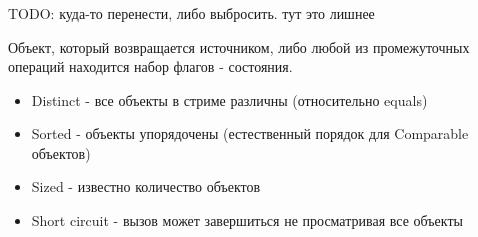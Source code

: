 \begin{frame}
\frametitle{\insertsection} 
\framesubtitle{\insertsubsection}
TODO: куда-то перенести, либо выбросить. тут это лишнее

Объект, который возвращается источником, либо любой из промежуточных операций находится набор флагов - состояния.
\begin{itemize}
	\item Distinct - все объекты в стриме различны (относительно equals)
	\item Sorted - объекты упорядочены (естественный порядок для Comparable объектов)
	\item Sized - известно количество объектов
	\item Short circuit - вызов может завершиться не просматривая все объекты
\end{itemize}
\end{frame}